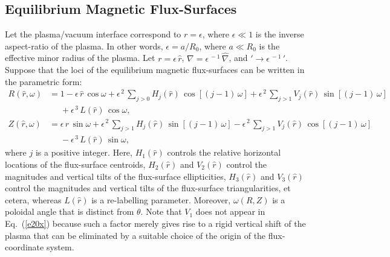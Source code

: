 \documentclass[12pt,prb,aps]{revtex4-1}
\begin{document}
\subsection{Equilibrium Magnetic Flux-Surfaces}
Let the plasma/vacuum interface  correspond to $r=\epsilon$, where $\epsilon\ll 1$ is the inverse aspect-ratio of the
plasma. In other words, $\epsilon=a/R_0$, where $a\ll R_0$ is the effective minor radius of the plasma. 
Let $r=\epsilon\,\hat{r}$, $\nabla =\epsilon^{\,-1}\,\hat{\nabla}$, and $'\rightarrow \epsilon^{\,-1}\,'$. 
Suppose that the loci of the equilibrium magnetic flux-surfaces can be written in the parametric form:\,\cite{con0,gim,am1,fitz2024}
\begin{align}
R(\hat{r},\omega) &= 1 -\epsilon\,\hat{r}\,\cos\omega + \epsilon^{\,2}\,\sum_{j>0}H_j(\hat{r})\,\cos[(j-1)\,\omega] + \epsilon^{\,2}\,\sum_{j>1}V_j(\hat{r})\,\sin[(j-1)\,\omega] \nonumber\\[0.5ex]
&\phantom{=}+\epsilon^{\,3}\,L(\hat{r})\,\cos\omega,\label{e19x}\\[0.5ex]
Z(\hat{r},\omega)&= \epsilon\,\hat{r}\,\sin\omega +\epsilon^{\,2}\,\sum_{j>1}H_j(\hat{r})\,\sin[(j-1)\,\omega]
-\epsilon^{\,2}\,\sum_{j>1}V_j(\hat{r})\,\cos[(j-1)\,\omega]\nonumber\\[0.5ex]&\phantom{=}-\epsilon^{\,3}\,L(\hat{r})\,\sin\omega,\label{e20x}
\end{align}
where $j$ is a positive integer. 
Here, $H_1(\hat{r})$  controls the relative horizontal locations of the flux-surface centroids, $H_2(\hat{r})$ and $V_2(\hat{r})$ control the 
magnitudes and vertical tilts of the flux-surface ellipticities, $H_3(\hat{r})$ and
$V_3(\hat{r})$ control the magnitudes and vertical tilts of the flux-surface triangularities, et cetera, whereas $L(\hat{r})$ is a
re-labelling parameter. Moreover, $\omega(R,Z)$ is a  poloidal angle that is distinct from $\theta$. Note that $V_1$ does not appear in Eq.~(\ref{e20x})
because such a factor merely gives rise to a rigid vertical shift of the plasma that can be eliminated by a suitable choice of the
origin of the flux-coordinate system.\cite{fitz2024}
\end{document}
